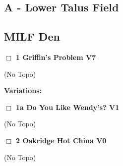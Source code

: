 \begin{multicols}{2}




\newpage

\section{A - Lower Talus Field}\label{sa:Lower Talus Field}





\needspace{10em}
\subsection*{MILF Den}\label{bf:MILF Den}




\needspace{2em}
\label{rt:Griffin's Problem}
\colorbox{Goldenrod!50}{
\parbox{0.95\linewidth}{
\hspace{-1ex}\textbf{$\Box$
1 Griffin's Problem V7  
}}}
\begin{adjustwidth}{1.3em}{}			


  (No Topo)
\end{adjustwidth}


\begin{adjustwidth}{0.5cm}{}				
\needspace{4em}
\textbf{Variations:} \newline

\needspace{2em}
\label{vr:Do You Like Wendy's?}
\colorbox{green!20}{
\parbox{0.95\linewidth}{
\hspace{-1ex}\textbf{$\Box$
1a Do You Like Wendy's? V1  
}}}
\begin{adjustwidth}{1.3em}{}			


  (No Topo)
\end{adjustwidth}



\end{adjustwidth}


\needspace{2em}
\label{rt:Oakridge Hot China}
\colorbox{green!20}{
\parbox{0.95\linewidth}{
\hspace{-1ex}\textbf{$\Box$
2 Oakridge Hot China V0  
}}}
\begin{adjustwidth}{1.3em}{}			


  (No Topo)
\end{adjustwidth}






\end{multicols}
